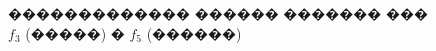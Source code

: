 \documentclass[a4paper]{article}
\begin{document}
\begin{figure}[h]
\begin{minipage}[h]{0.49\linewidth}
  \end{minipage}
  \caption{������������� ������ ������� ��� $f_3$ (�����) � $f_5$ (������)}
  \label{ris:image1}
\end{figure}

\begin{figure}[h]
  \begin{minipage}[h]{0.49\linewidth}
  \end{minipage}
  \hfill
  \begin{minipage}[h]{0.49\linewidth}

\end{minipage}
\end{figure}
\end{document}
